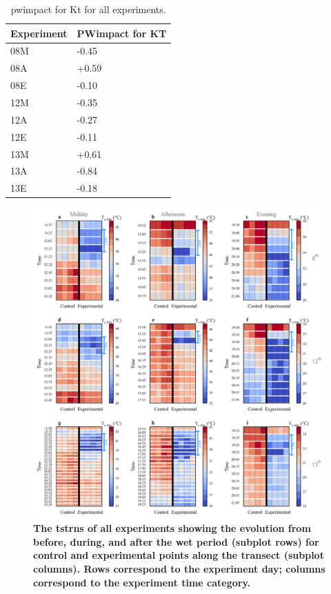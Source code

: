 \documentclass[final,3p,times,authoryear]{elsarticle}
\begin{document}
\begin{table}[!ht]\caption{\gls{pwimpact} for \gls{Kt} for all experiments.}
    \centering
    \begin{tabular}{|l|l|}
    \hline
        Experiment & PWimpact for KT \\ \hline
        08M & -0.45 \\ \hline
        08A & +0.59 \\ \hline
        08E & -0.10 \\ \hline
        12M & -0.35 \\ \hline
        12A & -0.27 \\ \hline
        12E & -0.11 \\ \hline
        13M & +0.61 \\ \hline
        13A & -0.84 \\ \hline
        13E & -0.18 \\ \hline
    \end{tabular}\label{table:7.4}
\end{table}



\begin{figure}
\centering
\includegraphics[trim={0 0 0 0},clip,scale=1.0]{pict044.png}
\caption{\bf The \gls{tstrns} of all experiments showing the evolution from before, during, and after the wet period (subplot rows) for control and experimental points along the transect (subplot columns). Rows correspond to the experiment day; columns correspond to the experiment time category.}
 \label{fig:7.15}
\end{figure}
\end{document}
